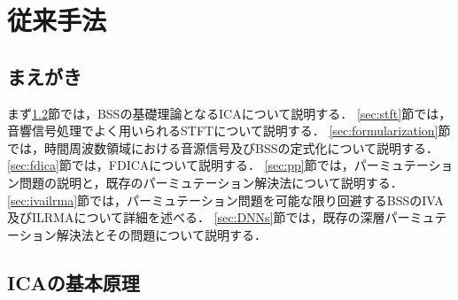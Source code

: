 \chapter{従来手法}
\label{chap:conv}

\section{まえがき}
まず\ref{sec:ica}節では，BSSの基礎理論となるICAについて説明する．
\ref{sec:stft}節では，音響信号処理でよく用いられるSTFTについて説明する．
\ref{sec:formularization}節では，時間周波数領域における音源信号及びBSSの定式化について説明する．
\ref{sec:fdica}節では，FDICAについて説明する．
\ref{sec:pp}節では，パーミュテーション問題の説明と，既存のパーミュテーション解決法について説明する．
\ref{sec:ivailrma}節では，パーミュテーション問題を可能な限り回避するBSSのIVA及びILRMAについて詳細を述べる．
\ref{sec:DNNs}節では，既存の深層パーミュテーション解決法とその問題について説明する．

\section{ICAの基本原理}
\label{sec:ica}

